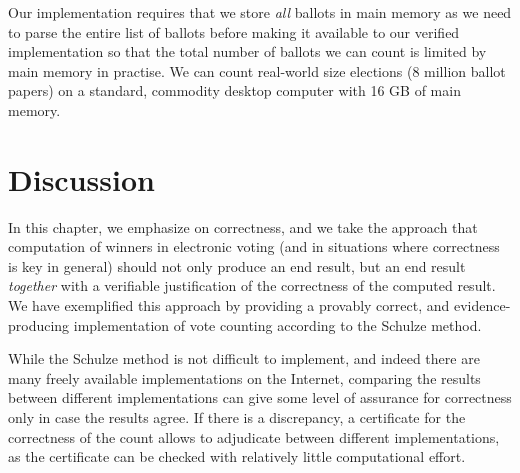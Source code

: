 Our implementation requires that we store \emph{all}
ballots in main memory as we need to parse the entire list of
ballots before making it available to our verified implementation so
that the total number of ballots we can count is limited by main
memory in practise. We can count real-world size elections (8
million ballot papers) on a standard, commodity desktop computer with
16 GB of main memory. 

  
\section{Discussion} \label{sec:discussion}

In this chapter,  we emphasize on correctness, 
and we take the approach that computation of winners in
electronic voting (and in situations where correctness is key in
general) should not only produce an end result, but an end result
\emph{together} with a verifiable justification of the correctness
of the computed result. We have exemplified this
approach by providing a provably correct, and evidence-producing
implementation of vote counting according to the Schulze method. 

While the Schulze method is not difficult to implement, and indeed
there are many freely available implementations on the Internet, 
comparing the
results between different implementations can give some level of
assurance for correctness only in case the results agree.  If there
is a discrepancy, a certificate for the correctness of the count
allows to adjudicate between different implementations, as the
certificate can be checked with relatively little computational
effort. 

